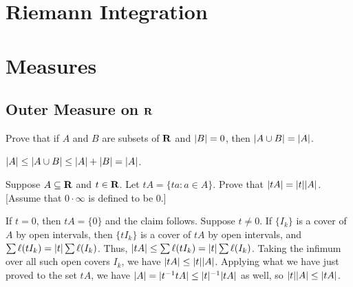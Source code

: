 \documentclass[11pt,oneside]{book}
\begin{document}
\hypersetup{pageanchor=false}
\frontmatter


\hypersetup{pageanchor=false}
\tableofcontents



\mainmatter


\chapter{Riemann Integration}





\chapter{Measures}

\section{Outer Measure on \texorpdfstring{$\mathbf{R}$}{R}}

\begin{exercise}
    Prove that if $A$ and $B$ are subsets of $\mathbf{R}$ and $\lvert B\rvert = 0$, then $\lvert A \cup B\rvert = \lvert A\rvert$.
\end{exercise}

\begin{solution}
    $\lvert A\rvert \leq \lvert A \cup B\rvert \leq \lvert A\rvert + \lvert B\rvert = \lvert A\rvert$.
\end{solution}

\begin{exercise}
    Suppose $A \subseteq \mathbf{R}$ and $t \in \mathbf{R}$. Let $tA = \{ta: a \in A\}$. Prove that $\lvert tA\rvert = \lvert t\rvert \lvert A\rvert$. [Assume that $0 \cdot \infty$ is defined to be $0$.]
\end{exercise}

\begin{solution}
    If $t = 0$, then $tA = \{0\}$ and the claim follows. Suppose $t \ne 0$. If $\{I_k\}$ is a cover of $A$ by open intervals, then $\{tI_k\}$ is a cover of $tA$ by open intervals, and $\sum \ell(tI_k) = \lvert t\rvert \sum \ell(I_k)$. Thus, $\lvert tA\rvert \leq \sum \ell(tI_k) = \lvert t\rvert \sum \ell(I_k)$. Taking the infimum over all such open covers $I_k$, we have $\lvert tA\rvert \leq \lvert t\rvert\lvert A\rvert$. Applying what we have just proved to the set $tA$, we have $\lvert A\rvert = \lvert t^{-1}tA\rvert \leq \lvert t\rvert^{-1}\lvert tA\rvert$ as well, so $\lvert t\rvert\lvert A\rvert \leq \lvert tA\rvert$.
\end{solution}
\end{document}
